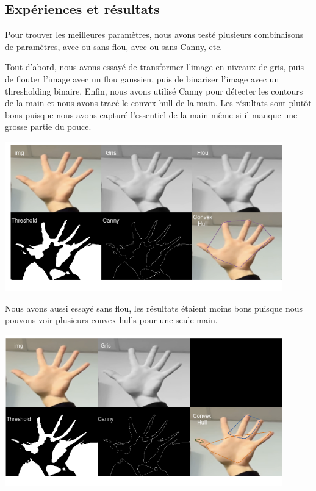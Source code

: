 \documentclass[11pt]{article}
\begin{document}
\subsection{Expériences et résultats}
Pour trouver les meilleures paramètres, nous avons testé plusieurs combinaisons de paramètres, avec ou sans flou, avec ou sans Canny, etc.

\bigbreak

Tout d'abord, nous avons essayé de transformer l'image en niveaux de gris, puis de flouter l'image avec un flou gaussien, puis de binariser l'image avec un thresholding binaire. Enfin, nous avons utilisé Canny pour détecter les contours de la main et nous avons tracé le convex hull de la main. Les résultats sont plutôt bons puisque nous avons capturé l'essentiel de la main même si il manque une grosse partie du pouce.
\begin{center}
    \includegraphics[width=0.9\textwidth]{images/pre_ttt_1.png}
\end{center}
\bigbreak

Nous avons aussi essayé sans flou, les résultats étaient moins bons puisque nous pouvons voir plusieurs convex hulls pour une seule main.
\begin{center}
    \includegraphics[width=0.9\textwidth]{images/pre_ttt_2.png}
\end{center}
\bigbreak
\end{document}
